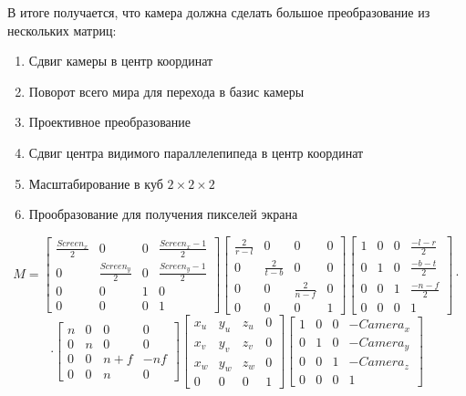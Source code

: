 \documentclass{article}
\begin{document}
В итоге получается, что камера должна сделать большое преобразование из нескольких матриц:

\begin{enumerate}
	\item Сдвиг камеры в центр координат
	\item Поворот всего мира для перехода в базис камеры
	\item Проективное преобразование
	\item Сдвиг центра видимого параллелепипеда в центр координат
	\item Масштабирование в куб $2 \times 2 \times 2$
	\item Прообразование для получения пикселей экрана
\end{enumerate}

$$ M = \begin{bmatrix}\frac{Screen_x}{2} & 0 & 0 & \frac{Screen_x - 1}{2} \\ 
					  0 & \frac{Screen_y}{2} & 0 & \frac{Screen_y - 1}{2} \\
					  0 & 0 & 1 & 0 \\
					  0 & 0 & 0 & 1\end{bmatrix}\begin{bmatrix}
					  \frac{2}{r - l} & 0 & 0 & 0 \\ 
					  0 & \frac{2}{t - b} & 0 & 0 \\
					  0 & 0 & \frac{2}{n - f} & 0 \\
					  0 & 0 & 0 & 1\end{bmatrix}\begin{bmatrix}
					  1 & 0 & 0 & \frac{-l - r}{2} \\ 
					  0 & 1 & 0 & \frac{-b - t}{2} \\
					  0 & 0 & 1 & \frac{-n - f}{2} \\
					  0 & 0 & 0 & 1\end{bmatrix} \cdot $$$$\cdot \begin{bmatrix}
					  n & 0 & 0 & 0 \\
					  0 & n & 0 & 0 \\
					  0 & 0 & n + f & -nf \\
					  0 & 0 & n & 0
					  \end{bmatrix}\begin{bmatrix}
					  x_u & y_u & z_u & 0 \\
					  x_v & y_v & z_v & 0 \\
					  x_w & y_w & z_w & 0 \\
					  0 & 0 & 0 & 1
					  \end{bmatrix}\begin{bmatrix}
					  1 & 0 & 0 & -Camera_x \\
					  0 & 1 & 0 & -Camera_y \\
					  0 & 0 & 1 & -Camera_z \\
					  0 & 0 & 0 & 1
					  \end{bmatrix}$$
\end{document}
